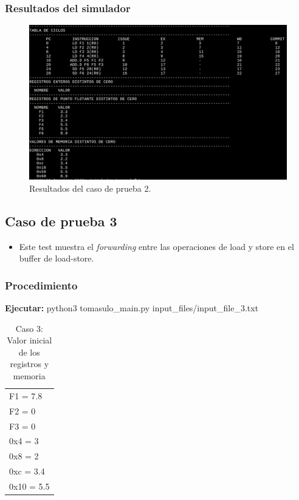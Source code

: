 \documentclass[a4paper]{article}
\begin{document}
	\subsubsection*{Resultados del simulador}

	\begin{figure}[H]
	\centering
	\includegraphics[width=1\textwidth]{figures/test2.png}
	\caption{\label{fig:bloques}Resultados del caso de prueba 2.}
	\end{figure}


	\subsection*{Caso de prueba 3}

	\begin{itemize}
		\item Este test muestra el \textit{forwarding} entre las operaciones de load y store en el buffer de load-store.
	\end{itemize}

	\subsubsection*{Procedimiento}

	\textbf{Ejecutar:} python3 tomasulo\_main.py input\_files/input\_file\_3.txt

	\begin{table}[H]
		\centering
		\caption*{Caso 3: Valor inicial de los registros y memoria}
		\begin{tabular}{l}
			F1 = 7.8 \\
			F2 = 0 \\
			F3 = 0 \\
			0x4 = 3 \\
			0x8 = 2 \\
			0xc = 3.4 \\
			0x10 = 5.5
		\end{tabular}
	\end{table}
\end{document}
